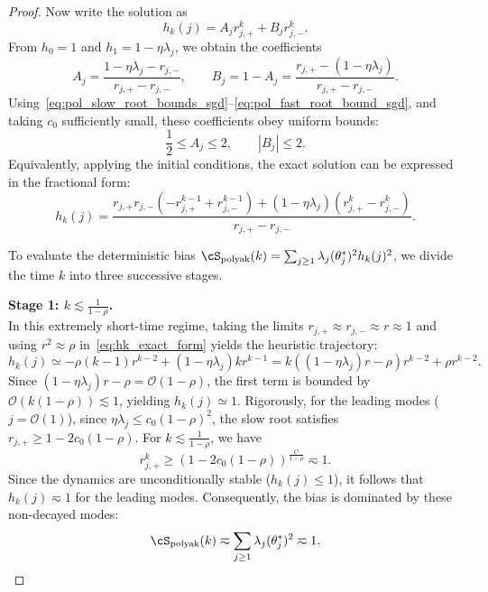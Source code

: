 \documentclass[11pt]{article}
\newcommand{\polyak}{\mathrm{polyak}}
\begin{document}
\begin{proof}
Now write the solution as
\[
    h_k(j)=A_jr_{j,+}^k+B_jr_{j,-}^k.
\]
From $h_0=1$ and $h_1=1-\eta\lambda_j$, we obtain the coefficients
\[
    A_j=\frac{1-\eta\lambda_j-r_{j,-}}{r_{j,+}-r_{j,-}},
    \qquad
    B_j=1-A_j = \frac{r_{j,+}-(1-\eta\lambda_j)}{r_{j,+}-r_{j,-}}.
\]
Using~\eqref{eq:pol_slow_root_bounds_sgd}--\eqref{eq:pol_fast_root_bound_sgd}, and taking $c_0$ sufficiently small, these coefficients obey uniform bounds:
\begin{equation}
\label{eq:pol_sgd_coeff_bounds}
    \frac12\le A_j\le2,
    \qquad
    |B_j|\le2.
\end{equation}
Equivalently, applying the initial conditions, the exact solution can be expressed in the fractional form:
\begin{equation}
\label{eq:hk_exact_form}
    h_k(j) = \frac{r_{j,+} r_{j,-}\left(-r_{j,+}^{k-1} + r_{j,-}^{k-1}\right) + (1-\eta\lambda_j)\left(r_{j,+}^k - r_{j,-}^k\right)}{r_{j,+} - r_{j,-}}.
\end{equation}

To evaluate the deterministic bias $\cS_{\polyak}(k) = \sum_{j\ge1}\lambda_j(\theta_j^*)^2 h_k(j)^2$, we divide the time $k$ into three successive stages.

\textbf{Stage 1: $k \lesssim \frac{1}{1-\rho}$.} \\
In this extremely short-time regime, taking the limits $r_{j,+}\approx r_{j,-} \approx r \approx 1$ and using $r^2 \approx \rho$ in~\eqref{eq:hk_exact_form} yields the heuristic trajectory:
\[
    h_k(j) \simeq -\rho(k-1)r^{k-2} + (1-\eta\lambda_j)k r^{k-1} = k\left((1-\eta\lambda_j)r - \rho \right)r^{k-2} + \rho r^{k-2}.
\]
Since $(1-\eta\lambda_j)r - \rho = \mathcal{O}(1-\rho)$, the first term is bounded by $\mathcal{O}(k(1-\rho)) \lesssim 1$, yielding $h_k(j) \simeq 1$. 
Rigorously, for the leading modes ($j=\mathcal{O}(1)$), since $\eta\lambda_j \le c_0(1-\rho)^2$, the slow root satisfies $r_{j,+} \ge 1 - 2c_0(1-\rho)$. For $k \lesssim \frac{1}{1-\rho}$, we have
\[
    r_{j,+}^k \ge \left(1 - 2c_0(1-\rho)\right)^{\frac{C}{1-\rho}} \eqsim 1.
\]
Since the dynamics are unconditionally stable ($h_k(j) \le 1$), it follows that $h_k(j) \eqsim 1$ for the leading modes. Consequently, the bias is dominated by these non-decayed modes:
\[
    \cS_{\polyak}(k) \eqsim \sum_{j\ge1}\lambda_j(\theta_j^*)^2 \eqsim 1.
\]


\end{proof}
\end{document}
